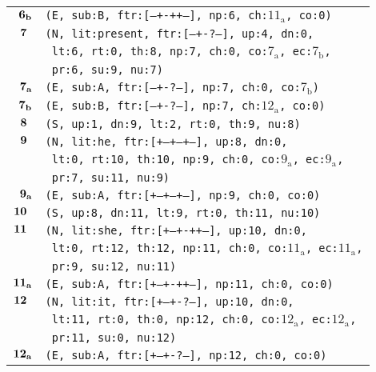 \documentclass{article}
\begin{document}
\begin{minipage}{\textwidth}
{\begin{tabular}{|r|l|}
    ${\textbf{\textrm{6}}_{\textbf{\textrm{b}}}}$ & \texttt{\texttt{(E,~sub:B,~ftr:[---+-++--],~np:6,~ch:${\textrm{11}_{\textrm{a}}}$,~co:0)}} \\
    ${\textbf{\textrm{7}}_{\phantom{z}}}$ & \texttt{\texttt{(N,~lit:present,~ftr:[---+-?---],~up:4,~dn:0,}} \\
    & \texttt{\texttt{~lt:6,~rt:0,~th:8,~np:7,~ch:0,~co:${\textrm{7}_{\textrm{a}}}$,~ec:${\textrm{7}_{\textrm{b}}}$,}} \\
    & \texttt{\texttt{~pr:6,~su:9,~nu:7)}} \\
    ${\textbf{\textrm{7}}_{\textbf{\textrm{a}}}}$ & \texttt{\texttt{(E,~sub:A,~ftr:[---+-?---],~np:7,~ch:0,~co:${\textrm{7}_{\textrm{b}}}$)}} \\
    ${\textbf{\textrm{7}}_{\textbf{\textrm{b}}}}$ & \texttt{\texttt{(E,~sub:B,~ftr:[---+-?---],~np:7,~ch:${\textrm{12}_{\textrm{a}}}$,~co:0)}} \\
    ${\textbf{\textrm{8}}_{\phantom{z}}}$ & \texttt{\texttt{(S,~up:1,~dn:9,~lt:2,~rt:0,~th:9,~nu:8)}} \\
    ${\textbf{\textrm{9}}_{\phantom{z}}}$ & \texttt{\texttt{(N,~lit:he,~ftr:[+--+--+--],~up:8,~dn:0,}} \\
    & \texttt{\texttt{~lt:0,~rt:10,~th:10,~np:9,~ch:0,~co:${\textrm{9}_{\textrm{a}}}$,~ec:${\textrm{9}_{\textrm{a}}}$,}} \\
    & \texttt{\texttt{~pr:7,~su:11,~nu:9)}} \\
    ${\textbf{\textrm{9}}_{\textbf{\textrm{a}}}}$ & \texttt{\texttt{(E,~sub:A,~ftr:[+--+--+--],~np:9,~ch:0,~co:0)}} \\
    ${\textbf{\textrm{10}}_{\phantom{z}}}$ & \texttt{\texttt{(S,~up:8,~dn:11,~lt:9,~rt:0,~th:11,~nu:10)}} \\
    ${\textbf{\textrm{11}}_{\phantom{z}}}$ & \texttt{\texttt{(N,~lit:she,~ftr:[+--+-++--],~up:10,~dn:0,}} \\
    & \texttt{\texttt{~lt:0,~rt:12,~th:12,~np:11,~ch:0,~co:${\textrm{11}_{\textrm{a}}}$,~ec:${\textrm{11}_{\textrm{a}}}$,}} \\
    & \texttt{\texttt{~pr:9,~su:12,~nu:11)}} \\
    ${\textbf{\textrm{11}}_{\textbf{\textrm{a}}}}$ & \texttt{\texttt{(E,~sub:A,~ftr:[+--+-++--],~np:11,~ch:0,~co:0)}} \\
    ${\textbf{\textrm{12}}_{\phantom{z}}}$ & \texttt{\texttt{(N,~lit:it,~ftr:[+--+-?---],~up:10,~dn:0,}} \\
    & \texttt{\texttt{~lt:11,~rt:0,~th:0,~np:12,~ch:0,~co:${\textrm{12}_{\textrm{a}}}$,~ec:${\textrm{12}_{\textrm{a}}}$,}} \\
    & \texttt{\texttt{~pr:11,~su:0,~nu:12)}} \\
    ${\textbf{\textrm{12}}_{\textbf{\textrm{a}}}}$ & \texttt{\texttt{(E,~sub:A,~ftr:[+--+-?---],~np:12,~ch:0,~co:0)}} \\
    \hline
  \end{tabular}
  }
\end{minipage}
\bigbreak
\end{document}
